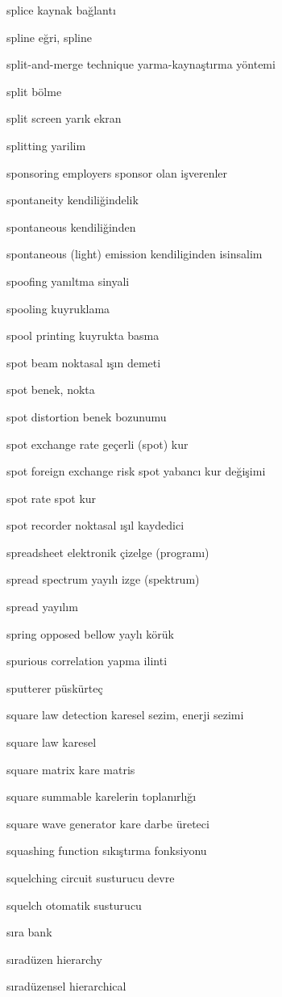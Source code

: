\documentclass[12pt,fleqn]{article}\usepackage{../../common}
\begin{document}
splice kaynak bağlantı

spline eğri, spline

split-and-merge technique yarma-kaynaştırma yöntemi

split bölme

split screen yarık ekran

splitting yarilim

sponsoring employers sponsor olan işverenler

spontaneity kendiliğindelik

spontaneous kendiliğinden

spontaneous (light) emission kendiliginden isinsalim

spoofing yanıltma sinyali

spooling kuyruklama

spool printing kuyrukta basma

spot beam noktasal ışın demeti

spot benek, nokta

spot distortion benek bozunumu

spot exchange rate geçerli (spot) kur

spot foreign exchange risk spot yabancı kur değişimi

spot rate spot kur

spot recorder noktasal ışıl kaydedici

spreadsheet elektronik çizelge (programı)

spread spectrum yayılı izge (spektrum)

spread yayılım

spring opposed bellow yaylı körük

spurious correlation yapma ilinti

sputterer püskürteç

square law detection karesel sezim, enerji sezimi

square law karesel

square matrix kare matris

square summable karelerin toplanırlığı

square wave generator kare darbe üreteci

squashing function sıkıştırma fonksiyonu

squelching circuit susturucu devre

squelch otomatik susturucu

sıra bank

sıradüzen hierarchy

sıradüzensel hierarchical
\end{document}
